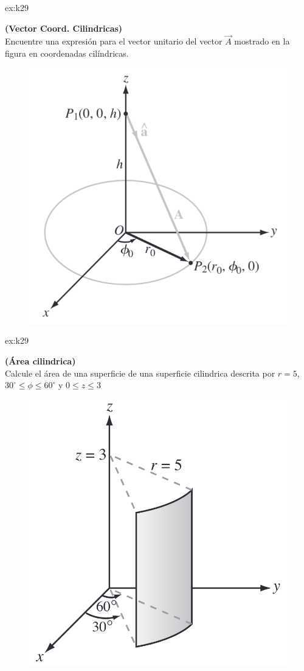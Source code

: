  \begin{multicols}{2}

    \begin{excercise}[][][$\vec{e}_A=\displaystyle{\frac{r_0\vec{e}_r-h\vec{k}}{\sqrt{r_0^2+h^2$}}}]{ex:k29}{ \textbf{(Vector Coord. Cilindricas)}\\
            Encuentre una expresión para el vector unitario del vector $\vec{A}$ mostrado en la figura en coordenadas cilíndricas.
            \begin{figure}[H]
                \centering
                \includegraphics[width=0.7\linewidth]{img/01_electric-field/1.png}
            \end{figure}
         }
    \end{excercise}
    
    \begin{excercise}[][][$S=\displaystyle{\frac{5\pi}{2}}$]{ex:k29}{ \textbf{(Área cilindrica)}\\
            Calcule el área de una superficie de una superficie cilindrica descrita por $r=5$, $30^\circ\leq\phi\leq 60^\circ$ y $0\leq z\leq 3$            
            \begin{figure}[H]
                \centering
                \includegraphics[width=0.7\linewidth]{img/01_electric-field/2.png}
            \end{figure}
         }
    \end{excercise}


\end{multicols}
